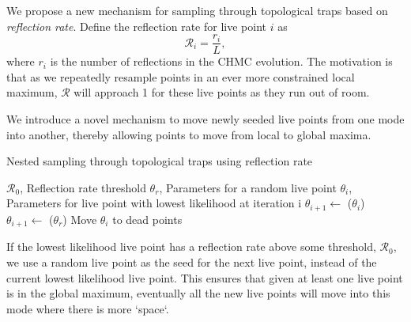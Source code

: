 \documentclass[11pt]{article}
\begin{document}
    We propose a new mechanism for sampling through topological traps based on \emph{reflection rate}.
    Define the reflection rate for live point $i$ as
    \begin{equation}\label{eq:reflect_rate}
        \mathcal{R}_i = \frac{r_i}{L},
    \end{equation}
    where $r_i$ is the number of reflections in the CHMC evolution.
    The motivation is that as we repeatedly resample points in an ever more constrained local maximum,
    $\mathcal{R}$ will approach 1 for these live points as they run out of room.

    We introduce a novel mechanism to move newly seeded live points from one mode into
    another, thereby allowing points to move from local to global maxima.

    \begin{algorithm}
        \caption{Nested sampling through topological traps using reflection rate}
        \label{alg:reflection_rate}
        \begin{algorithmic}
            \VARIABLES
            \STATE $\mathcal{R}_0$, Reflection rate threshold
            \STATE $\theta_r$, Parameters for a random live point
            \ENDVARIABLES
            \STATE
            \STATE $\theta_i$, Parameters for live point with lowest likelihood at iteration i
            \STATE $\theta_{i+1} \gets$ ($\theta_i$)
            \ELSE
            \STATE $\theta_{i+1} \gets$ ($\theta_r$)
            \ENDIF
            \STATE Move $\theta_i$ to dead points
        \end{algorithmic}
    \end{algorithm}

    If the lowest likelihood live point has a reflection rate above some threshold, $\mathcal{R}_0$, we use a
    random live point as the seed for the next live point, instead of the current lowest likelihood live point.
    This ensures that given at least one live point is in the global maximum, eventually all the new live points will move
    into this mode where there is more `space`.
\end{document}
